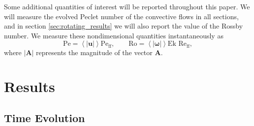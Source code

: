 \documentclass[aps, pre, onecolumn, nofootinbib, notitlepage, groupedaddress, amsfonts, amssymb, amsmath, longbibliography, superscriptaddress]{revtex4-1}
\newcommand{\angles}[1]{\ensuremath{\left\langle #1 \right\rangle}}
\newcommand{\Reff}{\ensuremath{\text{Re}_{\text{ff}}}}
\newcommand{\Peff}{\ensuremath{\text{Pe}_{\text{ff}}}}
\begin{document}
Some additional quantities of interest will be reported throughout this paper.
We will measure the evolved Peclet number of the convective flows in all sections, and in section \ref{sec:rotating_results} we will also report the value of the Rossby number.
We measure these nondimensional quantities instantaneously as
\begin{equation}
\text{Pe} = \angles{|\bm{u}|}\Peff,\qquad \text{Ro} = \angles{|\bm{\omega}|}\text{Ek }\Reff,
\end{equation}
where $|\bm{A}|$ represents the magnitude of the vector $\bm{A}$.





\section{Results}
\label{sec:2d_results}

\subsection{Time Evolution}
\end{document}

